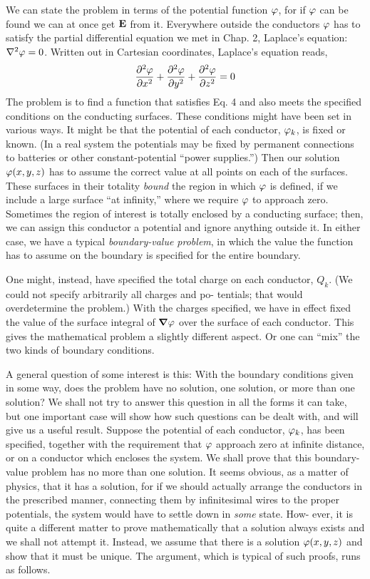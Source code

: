 We can state the problem in terms of the potential function $\varphi$,
for if $\varphi$ can be found we can at once get $\mathbf{E}$ from it. Everywhere outside
the conductors $\varphi$ has to satisfy the partial differential equation
we met in Chap. 2, Laplace's equation: $\nabla^2\varphi=0$. Written out in
Cartesian coordinates, Laplace's equation reads,
\begin{equation}
   \frac{\partial^2\varphi}{\partial x^2}
  +\frac{\partial^2\varphi}{\partial y^2}
  +\frac{\partial^2\varphi}{\partial z^2} = 0
\end{equation}
The problem is to find a function that satisfies Eq. 4 and also meets
the specified conditions on the conducting surfaces. These conditions
might have been set in various ways. It might be that the potential
of each conductor, $\varphi_k$, is fixed or known. (In a real system
the potentials may be fixed by permanent connections to batteries
or other constant-potential ``power supplies.'') Then our solution
$\varphi(x,y,z)$ has to assume the correct value at all points on each of the
surfaces. These surfaces in their totality \emph{bound} the region in which
$\varphi$ is defined, if we include a large surface ``at infinity,'' where we
require $\varphi$ to approach zero. Sometimes the region of interest is
totally enclosed by a conducting surface; then, we can assign this
conductor a potential and ignore anything outside it. In either case,
we have a typical \emph{boundary-value problem}, in which the value the
function has to assume on the boundary is specified for the entire
boundary.

One might, instead, have specified the total charge on each conductor,
$Q_k$. (We could not specify arbitrarily all charges and po-
tentials; that would overdetermine the problem.) With the charges
specified, we have in effect fixed the value of the surface integral of
$\boldsymbol{\nabla} \varphi$ over the surface of each conductor. This gives the mathematical
problem a slightly different aspect. Or one can ``mix'' the
two kinds of boundary conditions.

A general question of some interest is this: With the boundary
conditions given in some way, does the problem have no solution,
one solution, or more than one solution? We shall not try to answer
this question in all the forms it can take, but one important case will
show how such questions can be dealt with, and will give us a useful
result. Suppose the potential of each conductor, $\varphi_k$, has been
specified, together with the requirement that $\varphi$ approach zero at
infinite distance, or on a conductor which encloses the system. We
shall prove that this boundary-value problem has no more than one
solution. It seems obvious, as a matter of physics, that it has a solution,
for if we should actually arrange the conductors in the prescribed
manner, connecting them by infinitesimal wires to the proper
potentials, the system would have to settle down in \emph{some} state. How-
ever, it is quite a different matter to prove mathematically that a solution
always exists and we shall not attempt it. Instead, we assume
that there is a solution $\varphi(x,y,z)$ and show that it must be unique.
The argument, which is typical of such proofs, runs as follows.

